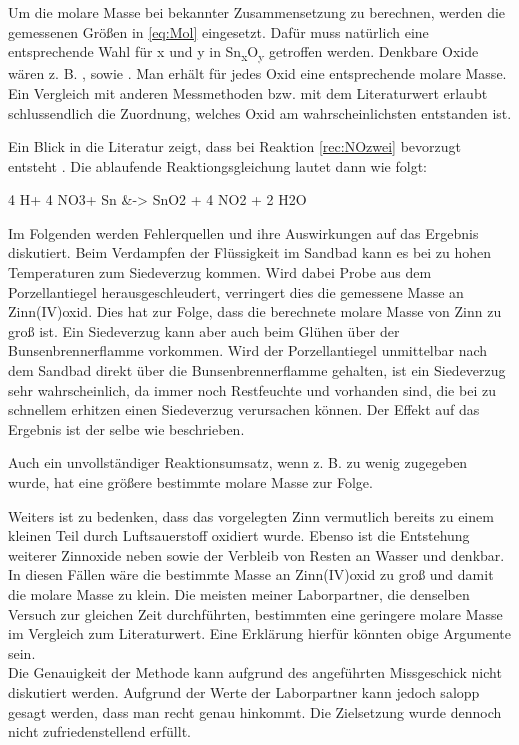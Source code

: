 \documentclass{article}
\begin{document}
    Um die molare Masse bei bekannter Zusammensetzung zu berechnen, werden die gemessenen Größen in \eqref{eq:Mol} eingesetzt. Dafür muss natürlich eine entsprechende Wahl für x und y in Sn\textsubscript{x}O\textsubscript{y} getroffen werden. Denkbare Oxide wären z. B. ,  sowie . Man erhält für jedes Oxid eine entsprechende molare Masse. Ein Vergleich mit anderen Messmethoden bzw. mit dem Literaturwert erlaubt schlussendlich die Zuordnung, welches Oxid am wahrscheinlichsten entstanden ist.
    
    Ein Blick in die Literatur zeigt, dass bei Reaktion \ref{rec:NOzwei} bevorzugt  entsteht \cite{ReactionProof}. Die ablaufende Reaktiongsgleichung lautet dann wie folgt:
    
    \begin{reactions}
        4 H\pch[] + 4 NO3\mch[] + Sn &-> SnO2 + 4 NO2 + 2 H2O \label{rec:NOzwei}
    \end{reactions}
    
    Im Folgenden werden Fehlerquellen und ihre Auswirkungen auf das Ergebnis diskutiert. Beim Verdampfen der Flüssigkeit im Sandbad kann es bei zu hohen Temperaturen zum Siedeverzug kommen. Wird dabei Probe aus dem Porzellantiegel herausgeschleudert, verringert dies die gemessene Masse an Zinn(IV)oxid. Dies hat zur Folge, dass die berechnete molare Masse von Zinn zu groß ist. Ein Siedeverzug kann aber auch beim Glühen über der Bunsenbrennerflamme vorkommen. Wird der Porzellantiegel unmittelbar nach dem Sandbad direkt über die Bunsenbrennerflamme gehalten, ist ein Siedeverzug sehr wahrscheinlich, da immer noch Restfeuchte und  vorhanden sind, die bei zu schnellem erhitzen einen Siedeverzug verursachen können. Der Effekt auf das Ergebnis ist der selbe wie beschrieben. 
    
    Auch ein unvollständiger Reaktionsumsatz, wenn z. B. zu wenig  zugegeben wurde, hat eine größere bestimmte molare Masse zur Folge. 
    
    Weiters ist zu bedenken, dass das vorgelegten Zinn vermutlich bereits zu einem kleinen Teil durch Luftsauerstoff oxidiert wurde. Ebenso ist die Entstehung weiterer Zinnoxide neben  sowie der Verbleib von Resten an Wasser und  denkbar. In diesen Fällen wäre die bestimmte Masse an Zinn(IV)oxid zu groß und damit die molare Masse zu klein. Die meisten meiner Laborpartner, die denselben Versuch zur gleichen Zeit durchführten, bestimmten eine geringere molare Masse im Vergleich zum Literaturwert. Eine Erklärung hierfür könnten obige Argumente sein. \\
    
    Die Genauigkeit der Methode kann aufgrund des angeführten Missgeschick nicht diskutiert werden. Aufgrund der Werte der Laborpartner kann jedoch salopp gesagt werden, dass man recht genau hinkommt. Die Zielsetzung wurde dennoch nicht zufriedenstellend erfüllt.
    
  \pagebreak
  
  \listofreactions
  \printbibliography[title=Literaturverzeichnis]
  \listoffigures
  \listoftables
  
\end{document}
